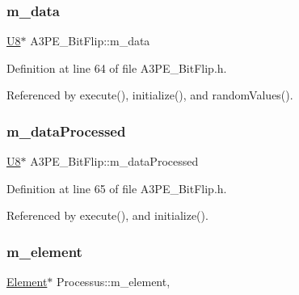 \subsubsection{\texorpdfstring{m\+\_\+data}{m\_data}}
{\footnotesize\ttfamily \hyperlink{classA3PE__BitFlip_ac561e6bbd8d4101ecc32016314a07581}{U8}$\ast$ A3\+P\+E\+\_\+\+Bit\+Flip\+::m\+\_\+data\hspace{0.3cm}{\ttfamily [private]}}



Definition at line 64 of file A3\+P\+E\+\_\+\+Bit\+Flip.\+h.



Referenced by execute(), initialize(), and random\+Values().

\mbox{\label{classA3PE__BitFlip_a5e64d319904fc8a6fe70b92afcf6ef4f}} 
\subsubsection{\texorpdfstring{m\+\_\+data\+Processed}{m\_dataProcessed}}
{\footnotesize\ttfamily \hyperlink{classA3PE__BitFlip_ac561e6bbd8d4101ecc32016314a07581}{U8}$\ast$ A3\+P\+E\+\_\+\+Bit\+Flip\+::m\+\_\+data\+Processed\hspace{0.3cm}{\ttfamily [private]}}



Definition at line 65 of file A3\+P\+E\+\_\+\+Bit\+Flip.\+h.



Referenced by execute(), and initialize().

\mbox{\label{classProcessus_aa9d24d53c3e52f36786cabb5d8e296e7}} 
\subsubsection{\texorpdfstring{m\+\_\+element}{m\_element}}
{\footnotesize\ttfamily \hyperlink{classElement}{Element}$\ast$ Processus\+::m\+\_\+element\hspace{0.3cm}{\ttfamily [protected]}, {\ttfamily [inherited]}}



